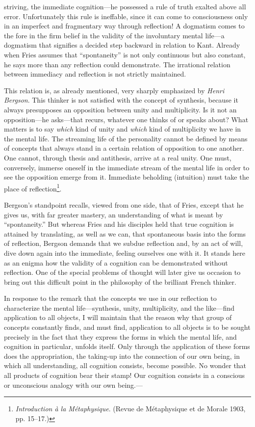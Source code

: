 \documentclass[12pt,a4paper]{book}
\newcommand{\opage}[1]{\marginnote{\footnotesize\textit{[#1]}}}
\begin{document}
striving, the immediate cognition---he possessed a rule of truth exalted
above all error. Unfortunately this rule is ineffable, since it can come
to consciousness only in an imperfect and fragmentary way through
reflection! A dogmatism comes to the fore in the firm belief in the
validity of the involuntary mental life---a dogmatism that signifies a
decided step backward in relation to Kant. Already when Fries assumes
that ``spontaneity'' is not only continuous but also constant, he says
more than any reflection could demonstrate. The irrational relation
between immediacy and reflection is not strictly maintained.

This relation is, as already mentioned, very sharply emphasized by
\emph{Henri Bergson}. This thinker is not satisfied with the concept of
synthesis, because it always presupposes an opposition between unity and
multiplicity. Is it not an \opage{17}opposition---he asks---that recurs, whatever
one thinks of or speaks about? What matters is to say \emph{which} kind
of unity and \emph{which} kind of multiplicity we have in the mental
life. The streaming life of the personality cannot be defined by means
of concepts that always stand in a certain relation of opposition to one
another. One cannot, through thesis and antithesis, arrive at a real
unity. One must, conversely, immerse oneself in the immediate stream of
the mental life in order to see the opposition emerge from it. Immediate
beholding (intuition) must take the place of
reflection\footnote{\emph{Introduction à la Métaphysique}. (Revue de
Métaphysique et de Morale 1903, pp. 15--17.)}.

Bergson's standpoint recalls, viewed from one side, that of Fries,
except that he gives us, with far greater mastery, an understanding of
what is meant by ``spontaneity.'' But whereas Fries and his disciples
held that true cognition is attained by translating, as well as we can,
that spontaneous basis into the forms of reflection, Bergson demands that
we subdue reflection and, by an act of will, dive down again into the
immediate, feeling ourselves one with it. It stands here as an enigma
how the validity of a cognition can be demonstrated without reflection.
One of the special problems of thought will later give us occasion to
bring out this difficult point in the philosophy of the brilliant French
thinker.

In response to the remark that the concepts we use in our reflection to
characterize the mental life---synthesis, unity, multiplicity, and the
like---find application to all objects, I will maintain that the reason
why that group of concepts constantly finds, and must find, application
to all objects is to be sought precisely in the fact that they express
the forms in which the mental life, and cognition in particular, unfolds
itself. Only through the application of these forms does the
appropriation, the taking-up into the connection of our own being, in
which all understanding, all cognition consists, become possible. No
wonder that all products of cognition bear their stamp! Our cognition
consists in a conscious or unconscious analogy with our own being.---
\end{document}
